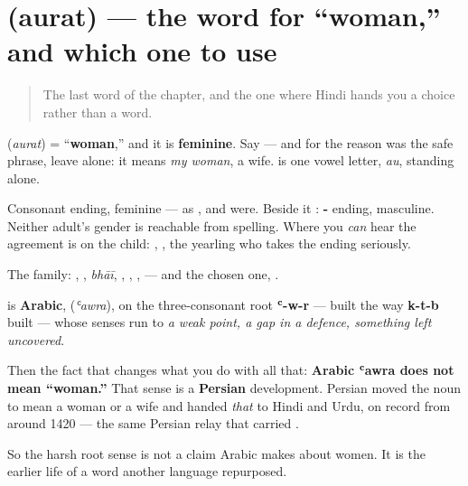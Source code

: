 \section[\texorpdfstring{\hi{औरत} / \hi{महिला} / \hi{स्त्री} (aurat / mahilā …)}{औरत / महिला / स्त्री (aurat / mahilā …)}]{ (aurat) — the word for \textquotedblleft{}woman,\textquotedblright{} and which one to use}

\label{lesson:HI-C39-aurat}



\begin{quote}
The last word of the chapter, and the one where Hindi hands you a choice rather than a word.
\end{quote}

\begin{grammarlens}[title={Grammar Lens: the pair, and the family complete}]
\textbf{} (\emph{aurat}) = \textquotedblleft{}\textbf{woman},\textquotedblright{} and it is \textbf{feminine}. Say \textbf{ } — and for the reason \textbf{ } was the safe phrase, leave \textbf{ } alone: it means \emph{my woman}, a wife. \textbf{} is one vowel letter, \emph{au}, standing alone.

Consonant ending, feminine — as \textbf{}, \textbf{} and \textbf{} were. Beside it \textbf{}: \textbf{-} ending, masculine. Neither adult's gender is reachable from spelling. Where you \emph{can} hear the agreement is on the child: \textbf{ }, \textbf{ }, the yearling who takes the ending seriously.

The family: \textbf{}, \textbf{}, \emph{bhāī}, \textbf{}, \textbf{}, \textbf{}, \textbf{} — and the chosen one, \textbf{}.
\end{grammarlens}

\begin{cousinweb}
\textbf{} is \textbf{Arabic}, \textbf{} (\emph{ʿawra}), on the three-consonant root \textbf{ʿ-w-r} — built the way \textbf{k-t-b} built \textbf{} — whose senses run to \emph{a weak point, a gap in a defence, something left uncovered}.

Then the fact that changes what you do with all that: \textbf{Arabic ʿawra does not mean \textquotedblleft{}woman.\textquotedblright{}} That sense is a \textbf{Persian} development. Persian moved the noun to mean a woman or a wife and handed \emph{that} to Hindi and Urdu, on record from around 1420 — the same Persian relay that carried \textbf{}.

So the harsh root sense is not a claim Arabic makes about women. It is the earlier life of a word another language repurposed.
\end{cousinweb}

